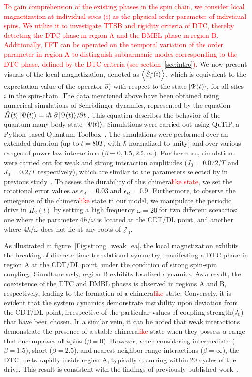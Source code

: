 \documentclass[12pt]{iopart}
\newcommand{\red}[1]{\textcolor{red}{#1}}
\begin{document}
\red{To gain comprehension of the existing phases in the spin chain, we consider local magnetization at individual sites (i) as the physical order parameter of individual spins. We utilize it to investigate TTSB and rigidity criteria of DTC, thereby detecting the DTC phase in region A and the DMBL phase in region B. Additionally, FFT can be operated on the temporal variation of the order parameter in region A to distinguish subharmonic modes corresponding to the DTC phase, defined by the DTC criteria (see section~\ref{sec:intro}).} We now present visuals of the local magnetization, denoted as $\expval{\hat{S}^z_i (t)}$, which is equivalent to the expectation value of the operator $\hat{\sigma}^z_i$ with respect to the state $\ket{\Psi(t)}$, for all sites $i$ in the spin-chain. The data mentioned above have been obtained using numerical simulations of Schr\"odinger dynamics, represented by the equation $\hat{H}(t)\ket{\Psi(t)}= i \hbar \pdv*{\ket{\Psi(t)}}{t}$. This equation describes the behavior of the quantum many-body state $\ket{\Psi(t)}$. Simulations were carried out using QuTiP, a Python-based Quantum Toolbox~\cite{Johansson2013}. The simulations were performed over an extended duration (up to $t = 80T$, with $\hbar$ normalized to unity) and over various ranges of power law interactions ($\beta = 0,1.5,2.5,\infty$). Furthermore, simulations were carried out for weak and strong interaction amplitudes ($J_0 = 0.072/T$ and $J_0 = 0.2/T$ respectively), which are similar to the parameters selected by in previous study~\cite{sakurai_phys_nodate,zhang_observation_2017}. To assess the durability of this chimera\red{like state}, we set the rotational error values as $\epsilon_A = 0.03$ and $\epsilon_B = 0.9$. Furthermore, to observe the emergence of the chimera\red{like} state in our model, we manipulate the periodic drive in $\hat{H}_2(t)$ by setting a high frequency $\omega=20$ for two different scenarios: one where the parameter $4h/\omega$ is located at the CDT/DL point, and another where $4h/\omega$  does not lie at any roots of $\mathcal{J}_0$.

As illustrated in figure~\ref{Fig:strong_weak_ea}, the local magnetization exhibits the breaking of discrete time translational symmetry, manifesting a DTC phase in region A at the CDT/DL point, under the condition of strong spin-spin coupling. Simultaneously, region B exhibits localized dynamics. As a result, the coexistence of the DTC and DMBL phases is observed in regions A and B, respectively, leading to the formation of a chimera\red{like} state. Conversely, it is evident that the system dynamics demonstrate instability upon deviation from the CDT/DL point, irrespective of the particular values of coupling strength($J_0$) that have been chosen. In a similar vein, it can be noted that weak interactions demonstrate the presence of a stable chimera\red{like} state when they possess a range that encompasses all spins ($\beta=0$). However, when considering intermediate ($\beta = 1.5$), short ($\beta = 2.5$), and nearest-neighbor range interactions ($\beta = \infty$), the DTC melts rapidly inside region A, typically occurring within $20$ cycles of the drive. This result is consistent with the findings of previously published work~\cite{sakurai_phys_nodate}.
	
\end{document}
